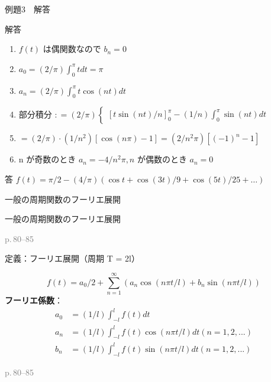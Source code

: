\documentclass[aspectratio=43,professionalfonts,handout]{beamer}
\begin{document}
\begin{frame}{例題3　解答}
  \begin{exampleblock}{解答}
  \begin{enumerate}[1.]
    \item[] $f(t)$ は偶関数なので $b_{n} = 0$
    \item[] $a_{0} = (2/\pi) \int_{0}^{\pi} t dt = \pi$
    \item[] $a_{n} = (2/\pi) \int_{0}^{\pi} t \cos(nt) dt$
    \item[] 部分積分 $: = (2/\pi)\begin{cases} [t \sin(nt)/n]_{0}^\pi - (1/n)\int_{0}^\pi \sin(nt) dt \end{cases}$
    \item[] $= (2/\pi) \cdot (1/n^{2})[\cos(n\pi) - 1] = (2/n^{2}\pi)[(-1)^n - 1]$
    \item[] n が奇数のとき $a_{n} = -4/n^{2}\pi, n$ が偶数のとき $a_{n} = 0$
  \end{enumerate}
  \end{exampleblock}
  \begin{alertblock}{答}
    $f(t) = \pi/2 - (4/\pi)(\cos t + \cos(3t)/9 + \cos(5t)/25 + \ldots)$
  \end{alertblock}
\end{frame}

\begin{frame}{一般の周期関数のフーリエ展開}
  \begin{block}{}
  {\large 一般の周期関数のフーリエ展開}
  \end{block}
  \vfill\hfill{\scriptsize \textcolor{gray}{p.\,80--85}}
\end{frame}

\begin{frame}{定義：フーリエ展開（周期 T = 2l）}
  \begin{block}{}
  \[
    f(t) = a_{0}/2 + \sum_{n=1}^\infty (a_{n}\cos(n\pi t/l) + b_{n}\sin(n\pi t/l))
  \]
  \medskip\textbf{フーリエ係数}：
  \begin{align*}
    a_{0} &= (1/l) \int_{-l}^{l} f(t) dt \\
    a_{n} &= (1/l) \int_{-l}^{l} f(t)\cos(n\pi t/l) dt  (n = 1, 2, ...) \\
    b_{n} &= (1/l) \int_{-l}^{l} f(t)\sin(n\pi t/l) dt  (n = 1, 2, ...)
  \end{align*}
  \end{block}
  \vfill\hfill{\scriptsize \textcolor{gray}{p.\,80--85}}
\end{frame}
\end{document}
